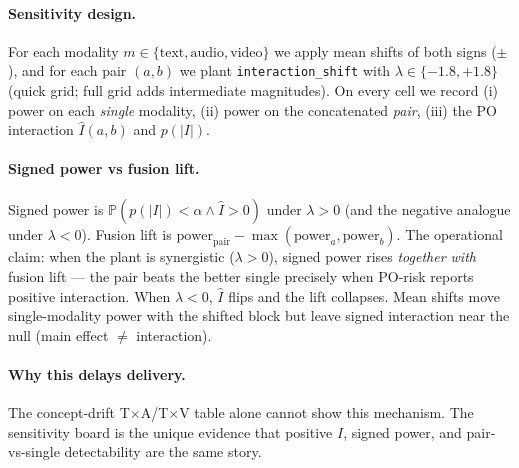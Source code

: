 \paragraph{Sensitivity design.}
For each modality $m\in\{\mathrm{text},\mathrm{audio},\mathrm{video}\}$ we apply
mean shifts of both signs ($\pm$), and for each pair $(a,b)$ we plant
\texttt{interaction\_shift} with $\lambda\in\{-1.8,+1.8\}$ (quick grid; full
grid adds intermediate magnitudes). On every cell we record
(i) power on each \emph{single} modality,
(ii) power on the concatenated \emph{pair},
(iii) the PO interaction $\hat I(a,b)$ and $p(|I|)$.

\paragraph{Signed power vs fusion lift.}
Signed power is
$\mathbb{P}(p(|I|)<\alpha \wedge \hat I>0)$ under $\lambda>0$
(and the negative analogue under $\lambda<0$).
Fusion lift is
$\mathrm{power}_{\mathrm{pair}}-\max(\mathrm{power}_a,\mathrm{power}_b)$.
The operational claim: when the plant is synergistic ($\lambda>0$),
signed power rises \emph{together with} fusion lift --- the pair beats the
better single precisely when PO-risk reports positive interaction.
When $\lambda<0$, $\hat I$ flips and the lift collapses.
Mean shifts move single-modality power with the shifted block but leave
signed interaction near the null (main effect $\neq$ interaction).

\paragraph{Why this delays delivery.}
The concept-drift T$\times$A/T$\times$V table alone cannot show this
mechanism. The sensitivity board is the unique evidence that
positive $I$, signed power, and pair-vs-single detectability are the same story.